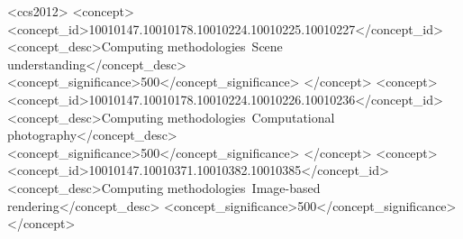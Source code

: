 \documentclass[acmtog,authorversion]{acmart}
\begin{document}
\begin{CCSXML}
<ccs2012>
<concept>
<concept_id>10010147.10010178.10010224.10010225.10010227</concept_id>
<concept_desc>Computing methodologies~Scene understanding</concept_desc>
<concept_significance>500</concept_significance>
</concept>
<concept>
<concept_id>10010147.10010178.10010224.10010226.10010236</concept_id>
<concept_desc>Computing methodologies~Computational photography</concept_desc>
<concept_significance>500</concept_significance>
</concept>
<concept>
<concept_id>10010147.10010371.10010382.10010385</concept_id>
<concept_desc>Computing methodologies~Image-based rendering</concept_desc>
<concept_significance>500</concept_significance>
</concept>
\end{CCSXML}


\end{document}
